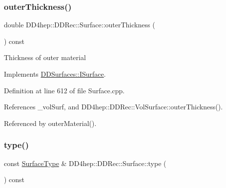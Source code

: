 \hypertarget{class_d_d4hep_1_1_d_d_rec_1_1_surface_a55a7d1f21ef278115e16cbb353ab01f7}{}\label{class_d_d4hep_1_1_d_d_rec_1_1_surface_a55a7d1f21ef278115e16cbb353ab01f7} 
\subsubsection{\texorpdfstring{outer\+Thickness()}{outerThickness()}}
{\footnotesize\ttfamily double D\+D4hep\+::\+D\+D\+Rec\+::\+Surface\+::outer\+Thickness (\begin{DoxyParamCaption}{ }\end{DoxyParamCaption}) const\hspace{0.3cm}{\ttfamily [virtual]}}

Thickness of outer material 

Implements \hyperlink{class_d_d_surfaces_1_1_i_surface_aa2559a8904e474835c5d24c243a44909}{D\+D\+Surfaces\+::\+I\+Surface}.



Definition at line 612 of file Surface.\+cpp.



References \+\_\+vol\+Surf, and D\+D4hep\+::\+D\+D\+Rec\+::\+Vol\+Surface\+::outer\+Thickness().



Referenced by outer\+Material().

\hypertarget{class_d_d4hep_1_1_d_d_rec_1_1_surface_a28bdf868a99ad7cdde62cb1b4309173d}{}\label{class_d_d4hep_1_1_d_d_rec_1_1_surface_a28bdf868a99ad7cdde62cb1b4309173d} 
\subsubsection{\texorpdfstring{type()}{type()}}
{\footnotesize\ttfamily const \hyperlink{class_d_d_surfaces_1_1_surface_type}{Surface\+Type} \& D\+D4hep\+::\+D\+D\+Rec\+::\+Surface\+::type (\begin{DoxyParamCaption}{ }\end{DoxyParamCaption}) const\hspace{0.3cm}{\ttfamily [virtual]}}

